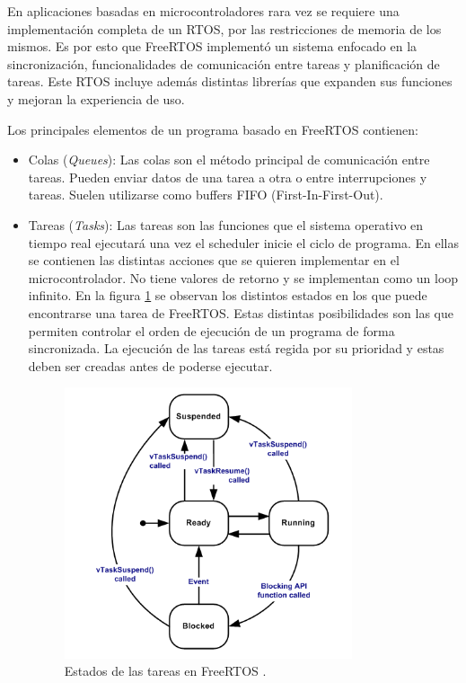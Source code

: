 En aplicaciones basadas en microcontroladores rara vez se requiere una implementación completa de un RTOS, por las restricciones de memoria de los mismos. Es por esto que FreeRTOS implementó un sistema enfocado en la sincronización, funcionalidades de comunicación entre tareas y planificación de tareas. Este RTOS incluye además distintas librerías que expanden sus funciones y mejoran la experiencia de uso.

Los principales elementos de un programa basado en FreeRTOS contienen:

\begin{itemize}
    \item Colas (\textit{Queues}): Las colas son el método principal de comunicación entre tareas. Pueden enviar datos de una tarea a otra o entre interrupciones y tareas. Suelen utilizarse como buffers FIFO (First-In-First-Out).
    \item Tareas (\textit{Tasks}): Las tareas son las funciones que el sistema operativo en tiempo real ejecutará una vez el scheduler inicie el ciclo de programa. En ellas se contienen las distintas acciones que se quieren implementar en el microcontrolador. No tiene valores de retorno y se implementan como un loop infinito. En la figura \ref{fig:RTOSTasks} se observan los distintos estados en los que puede encontrarse una tarea de FreeRTOS. Estas distintas posibilidades son las que permiten controlar el orden de ejecución de un programa de forma sincronizada. La ejecución de las tareas está regida por su prioridad y estas deben ser creadas antes de poderse ejecutar.
    
    \begin{figure}[H]
        \centering
        \includegraphics[width = 0.8\textwidth]{imagenes/cap1_marcoteo/TasksRTOS.png}
        \caption{Estados de las tareas en FreeRTOS \citep{rtos}.}
        \label{fig:RTOSTasks}
    \end{figure}


\end{itemize}
